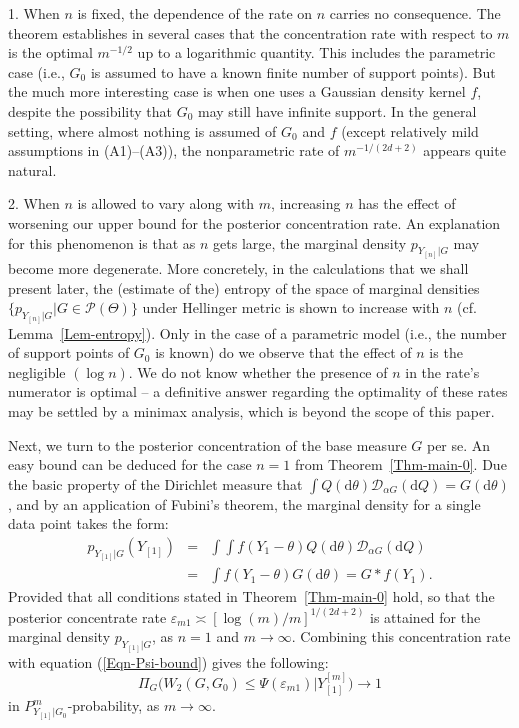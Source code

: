 \documentclass[MSNbibl,number,citesort]{arxbj}
\newcommand{\eqref}[1]{(\ref{#1})}
\newcommand{\Pcal}{\mathscr{P}}
\newcommand{\DP}{\mathscr{D}}
\newcommand{\pGone}{p_{Y_{[1]}|G}}
\newcommand{\YYone}{Y_{[1]}}
\begin{document}
\begin{remarks*}
%
1. When $n$ is fixed, the dependence of the rate on $n$ carries
no consequence. The theorem establishes in several cases that
the concentration rate with respect to $m$ is the
optimal $m^{-1/2}$ up to a logarithmic quantity. This includes the
parametric case
(i.e., $G_0$ is assumed to have a known finite number of support points).
But the much more interesting case is
when one uses a Gaussian density kernel $f$, despite the possibility
that $G_0$ may still have infinite support. In the general setting, where
almost nothing is assumed of $G_0$ and $f$ (except relatively mild
assumptions in (A1)--(A3)), the nonparametric rate of $m^{-1/(2d+2)}$
appears quite natural.

2. When $n$ is allowed to vary along with $m$,
increasing $n$ has the effect of worsening our upper bound for
the posterior concentration rate.
An explanation for this phenomenon is that as $n$ gets large, the marginal
density ${p_{Y_{[n]}|G}}$ may become more degenerate.
More concretely, in the calculations that we shall
present later, the (estimate of the) entropy of the space of
marginal densities $\{{p_{Y_{[n]}|G}}| G \in\Pcal(\Theta
)\}$ under Hellinger
metric is shown to increase with $n$ (cf. Lemma~\ref{Lem-entropy}).
Only in the case of a parametric model (i.e., the number of support
points of $G_0$ is known) do we observe that the effect of $n$ is
the negligible $(\log n)$. We do not know whether the presence of
$n$ in the rate's numerator is optimal -- a definitive answer regarding
the optimality of these rates may be
settled by a
minimax analysis, which is beyond the scope of this paper.
\end{remarks*}

Next, we turn to the posterior concentration of the base measure
$G$ per se. An easy bound can be deduced for the case $n=1$
from Theorem~\ref{Thm-main-0}. Due the basic property of the
Dirichlet measure that $\int Q(\mathrm{d}\theta) \DP_{\alpha G}(\mathrm{d}Q)
= G(\mathrm{d}\theta)$, and by an application of Fubini's theorem,
the marginal density for a single data point takes the form:
%
\begin{eqnarray*}
\pGone(\YYone) & = & \int\int f(Y_1-\theta)Q(\mathrm{d}\theta)
\DP_{\alpha G}(\mathrm{d}Q)
\\
& = & \int f(Y_1 - \theta) G(\mathrm{d}\theta) = G*f(Y_1).
\end{eqnarray*}
%
Provided that all conditions stated in Theorem~\ref{Thm-main-0} hold,
so that the posterior concentrate rate $\varepsilon_{m1}
\asymp[\log(m)/m]^{1/(2d+2)}$ is attained
for the marginal density $\pGone$, as $n=1$ and $m\rightarrow\infty$.
Combining this concentration rate with equation \eqref{Eqn-Psi-bound}
gives the
following:
%
\[
\Pi_G \bigl(W_2(G,G_0) \leq\Psi(
\varepsilon_{m1}) |Y_{[1]}^{[m]} \bigr)
\longrightarrow1
\]
%
in $P^m_{\YYone|G_0}$-probability, as $m\rightarrow\infty$.
\end{document}
